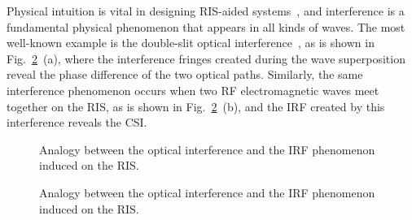 \documentclass[journal,twocolumn]{IEEEtran}
\theoremstyle{nonumberplain}
\begin{document}
    Physical intuition is vital in designing RIS-aided systems~\cite{najafi2020physics}, and interference is a fundamental physical phenomenon that appears in all kinds of waves. The most well-known example is the double-slit optical interference~\cite{louradour1993interference}, as is shown in Fig.~\ref{fig:scheme}~(a), where the interference fringes created during the wave superposition reveal the phase difference of the two optical paths. Similarly, the same interference phenomenon occurs when two RF electromagnetic waves meet together on the RIS, as is shown in Fig.~\ref{fig:scheme}~(b), and the \ac{IRF} created by this interference reveals the \ac{CSI}. 
    \ifx\onecol\undefined
    \begin{figure}[t]
        \centering
        \caption{Analogy between the optical interference and the \ac{IRF} phenomenon induced on the RIS.}
        \label{fig:scheme}
    \end{figure}
    \else 
        \begin{figure}[t]
            \centering
            \caption{Analogy between the optical interference and the \ac{IRF} phenomenon induced on the RIS.}
            \label{fig:scheme}
        \end{figure}
\end{document}
